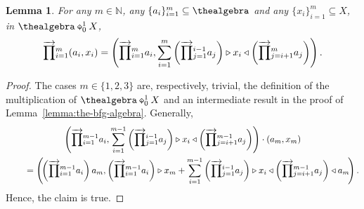 \documentclass[10pt,a4paper]{amsart}
\numberwithin{equation}{section}
\newtheorem{Lemma}[Theorem]{Lemma}
\newcommand{\diamondplus}{\mathbin{\ooalign{\hfil$\diamond$\hfil\cr\hfil$\scriptscriptstyle+$\hfil\cr}}}
\newcommand{\HSalgebraconstructdeform}[4]{#2\diamondplus^{#1}_{#4}#3}
\newcommand{\Smonoidalproduct}{\otimes}
\newcommand{\pint}{\mathbb{N}}
\newcommand{\Sleftmoduleaction}{\triangleright}
\newcommand{\Srightmoduleaction}{\triangleleft}
\newcommand{\tsrightwardproduct}[2]{{\overrightarrow{ \prod}}\vphantom{ \prod}_{#1}^{#2}}
\newcommand{\themodule}{X}
\begin{document}
{{
    \newcommand{\thedeform}{c}
  \newcommand{\thedeformxx}[2]{c(#1 \Smonoidalproduct #2)}
  \newcommand{\thirda}{a_3}
    \begin{Lemma}
    \newcommand{\somenumber}{m}
    \newcommand{\somea}[1]{a_{#1}}
    \newcommand{\somex}[1]{x_{#1}}
    \newcommand{\someindex}{i}
    \newcommand{\otherindex}{j}
    \label{lemma:the-bfg-algebra-multiplication}
    For any  $\somenumber\in\pint$, any $\{\somea{\someindex}\}_{\someindex=1}^\somenumber\subseteq \thealgebra$ and any $\{\somex{\someindex}\}_{\someindex=1}^\somenumber\subseteq \themodule$,  in $\HSalgebraconstructdeform{1}{\thealgebra}{\themodule}{0}$,
    \[
      \tsrightwardproduct{\someindex=1}{\somenumber} (\somea{\someindex},\somex{\someindex})=\left(\tsrightwardproduct{\someindex=1}{\somenumber}\somea{\someindex}, \sum_{\someindex=1}^\somenumber\left(\tsrightwardproduct{\otherindex=1}{\someindex-1}\somea{\otherindex}\right)\Sleftmoduleaction\somex{\someindex}\Srightmoduleaction\left(\tsrightwardproduct{\otherindex=\someindex+1}{\somenumber}\somea{\otherindex}\right)\right).
    \]
\end{Lemma}
\begin{proof}
    \newcommand{\somenumber}{m}
    \newcommand{\somea}[1]{a_{#1}}
    \newcommand{\somex}[1]{x_{#1}}
    \newcommand{\someindex}{i}
    \newcommand{\otherindex}{j}
    The cases $\somenumber\in\{1,2,3\}$ are, respectively,  trivial, the definition of the multiplication  of $\HSalgebraconstructdeform{1}{\thealgebra}{\themodule}{0}$ and an intermediate result in the proof of Lem\-ma~\ref{lemma:the-bfg-algebra}. Generally,
    \begin{gather*} \left(\tsrightwardproduct{\someindex=1}{\somenumber-1}\somea{\someindex},{ \sum_{\someindex=1}^{\somenumber-1}}\left(\tsrightwardproduct{\otherindex=1}{\someindex-1}\somea{\otherindex}\right)\Sleftmoduleaction\somex{\someindex}\Srightmoduleaction\left(\tsrightwardproduct{\otherindex=\someindex+1}{\somenumber-1}\somea{\otherindex}\right)\right)\cdot (\somea{\somenumber},\somex{\somenumber})\\
\qquad{}      = \left(\!\left(\tsrightwardproduct{\someindex=1}{\somenumber-1}\somea{\someindex}\right)\somea{\somenumber},  \left(\tsrightwardproduct{\someindex=1}{\somenumber-1}\somea{\someindex}\right)\Sleftmoduleaction\somex{\somenumber}+{ \sum_{\someindex=1}^{\somenumber-1}}\left(\tsrightwardproduct{\otherindex=1}{\someindex-1}\somea{\otherindex}\right)\Sleftmoduleaction\somex{\someindex}\Srightmoduleaction\left(\tsrightwardproduct{\otherindex=\someindex+1}{\somenumber-1}\somea{\otherindex}\right)\Srightmoduleaction \somea{\somenumber}\!\right).
\end{gather*}
Hence, the claim is true.
\end{proof}
  }

}
\end{document}
